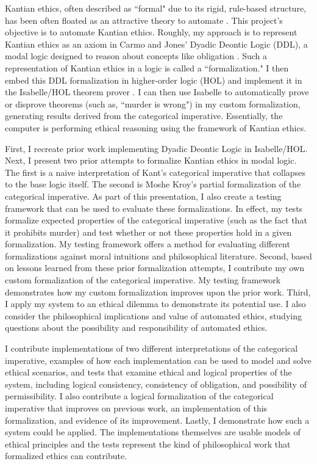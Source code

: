 \begin{isabellebody}
\begin{isamarkuptext}
Kantian ethics, often described as ``formal" due to its rigid, rule-based structure, has been often 
floated as an attractive theory to automate \citep{powers, BL, lin}. This project's objective is to 
automate Kantian ethics. Roughly, my approach is to represent Kantian
ethics as an axiom in Carmo and Jones' Dyadic Deontic Logic (DDL), a modal logic designed to reason
about concepts like obligation \citep{CJDDL}. Such a representation of Kantian ethics in a logic
is called a ``formalization." I then embed this DDL formalization in higher-order logic 
(HOL) and implement it in the Isabelle/HOL theorem prover  \citep{isabelle}. I can then use Isabelle 
to automatically prove or disprove theorems (such as, ``murder is wrong") in my custom formalization, generating results
derived from the categorical imperative. Essentially, the computer is performing ethical reasoning using
the framework of Kantian ethics.

First, I recreate prior work implementing Dyadic Deontic Logic in Isabelle/HOL. Next, I present two 
prior attempts to formalize Kantian ethics in modal logic. The first is a naive
interpretation of Kant's categorical imperative that collapses to the base logic itself. The second is 
Moshe Kroy's partial formalization of the categorical imperative. As part of this presentation, I also
create a testing framework that can be used to evaluate these formalizations. In effect, my tests formalize
expected properties of the categorical imperative (such as the fact that it prohibits murder) and test 
whether or not these properties hold in a given formalization. My testing framework offers a method for
evaluating different formalizations against moral intuitions and philosophical literature. Second, based on
lessons learned from these prior formalization attempts, I contribute my own custom formalization of
the categorical imperative. My testing framework demonstrates how my custom formalization improves upon
the prior work. Third, I apply my system to an ethical dilemma to demonstrate its potential use. I also
consider the philosophical implications and value of automated ethics, studying questions about the 
possibility and responsibility of automated ethics.

I contribute implementations of two different interpretations of the categorical imperative, 
examples of how each implementation can be used to model and solve ethical scenarios, and tests that
examine ethical and logical properties of the system, including logical consistency, consistency
of obligation, and possibility of permissibility. I also contribute a logical formalization of the categorical
imperative that improves on previous work, an implementation of this formalization, and evidence of 
its improvement. Lastly, I demonstrate how such a system could be applied. The implementations themselves are usable models 
of ethical principles and the tests represent the kind of philosophical work that formalized ethics 
can contribute.


\end{isamarkuptext}
\end{isabellebody}
